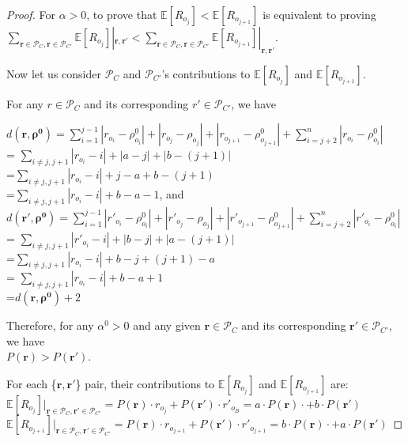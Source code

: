 \documentclass[11pt, oneside]{article}   	%
\begin{document}
\begin{proof}
For $\alpha > 0$, to prove that $\mathbb{E}[R_{o_j}] < \mathbb{E}[R_{o_{j+1}}]$ is equivalent to proving \\
$\sum\limits_{\bm{r}\in \mathcal{P}_C, \bm{r}\in \mathcal{P}_{C'}}\mathbb{E}[R_{o_j}] |_{\bm{r}, \bm{r'}} < \sum\limits_{\bm{r}\in \mathcal{P}_C, \bm{r}\in \mathcal{P}_{C'}}\mathbb{E}[R_{o_{j+1}}] |_{\bm{r}, \bm{r'}}$.


Now let us consider $\mathcal{P}_C$ and $\mathcal{P}_{C'}$'s contributions to $\mathbb{E}[R_{o_{j}}]$ and $\mathbb{E}[R_{o_{j+1}}]$.


For any $r \in \mathcal{P}_C$ and its corresponding $r' \in \mathcal{P}_{C'}$, we have

$d(\bm{r}, \bm{\rho^0}) = \sum\limits_{i=1}^{j-1}|r_{o_i} - \rho^0_{o_i}| + |r_{o_j} - \rho_{o_j}| + |r_{o_{j+1}} - \rho^0_{o_{j+1}}| + \sum\limits_{i = j+2}^{n}|r_{o_i} - \rho^0_{o_{i}}|$ \\
= $\sum\limits_{i \neq j, j+1} |r_{o_i} - i| + |a-j| + |b - (j+1)|$\\
=$\sum\limits_{i \neq j, j+1} |r_{o_i} - i| + j-a + b-(j+1)$\\
=$\sum\limits_{i \neq j, j+1} |r_{o_i} - i| + b-a -1 $, and \\

$d(\bm{r'}, \bm{\rho^0}) = \sum\limits_{i=1}^{j-1}|r'_{o_i} - \rho^0_{o_i}| + |r'_{o_j} - \rho_{o_j}| + |r'_{o_{j+1}} - \rho^0_{o_{j+1}}| + \sum\limits_{i = j+2}^{n}|r'_{o_i} - \rho^0_{o_{i}}|$ \\
= $\sum\limits_{i \neq j, j+1} |r'_{o_i} - i| + |b-j| + |a - (j+1)|$\\
=$\sum\limits_{i \neq j, j+1} |r_{o_i} - i| + b-j + (j+1)- a$ \\
= $\sum\limits_{i \neq j, j+1} |r_{o_i} - i| + b-a+1 $\\
=$d(\bm{r}, \bm{\rho^0}) +2$

Therefore, for any $\alpha^0 > 0$ and any given $\bm{r} \in \mathcal{P}_C$ and its corresponding $\bm{r'} \in \mathcal{P}_{C'}$, we have \\
 $P(\bm{r}) > P(\bm{r'}) $. 
 
 For each \{$\bm{r}, \bm{r'}$\} pair, their contributions to $\mathbb{E}[R_{o_j}]$ and $\mathbb{E}[R_{o_{j+1}}]$ are: \\
$\mathbb{E}[R_{o_j}]|_{\bm{r}\in \mathcal{P}_C,\bm{r'}\in \mathcal{P}_{C'}} = P(\bm{r})\cdot r_{o_j} + P(\bm{r'})\cdot r'_{o_B} = a\cdot P(\bm{r})\cdot + b\cdot P(\bm{r'}) $ \\
$\mathbb{E}[R_{o_{j+1}}]|_{\bm{r}\in \mathcal{P}_C,\bm{r'}\in \mathcal{P}_{C'}} = P(\bm{r})\cdot r_{o_{j+1}} + P(\bm{r'})\cdot r'_{o_{j+1}} = b\cdot P(\bm{r})\cdot + a\cdot P(\bm{r'})$ 


\end{proof}
\end{document}
